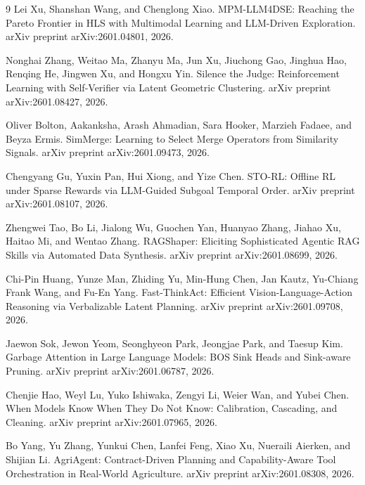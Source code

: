 \documentclass{article}
\begin{document}
\begin{thebibliography}{9}
Lei Xu, Shanshan Wang, and Chenglong Xiao. MPM-LLM4DSE: Reaching the Pareto Frontier in HLS with Multimodal Learning and LLM-Driven Exploration. arXiv preprint arXiv:2601.04801, 2026.

Nonghai Zhang, Weitao Ma, Zhanyu Ma, Jun Xu, Jiuchong Gao, Jinghua Hao, Renqing He, Jingwen Xu, and Hongxu Yin. Silence the Judge: Reinforcement Learning with Self-Verifier via Latent Geometric Clustering. arXiv preprint arXiv:2601.08427, 2026.

Oliver Bolton, Aakanksha, Arash Ahmadian, Sara Hooker, Marzieh Fadaee, and Beyza Ermis. SimMerge: Learning to Select Merge Operators from Similarity Signals. arXiv preprint arXiv:2601.09473, 2026.

Chengyang Gu, Yuxin Pan, Hui Xiong, and Yize Chen. STO-RL: Offline RL under Sparse Rewards via LLM-Guided Subgoal Temporal Order. arXiv preprint arXiv:2601.08107, 2026.

Zhengwei Tao, Bo Li, Jialong Wu, Guochen Yan, Huanyao Zhang, Jiahao Xu, Haitao Mi, and Wentao Zhang. RAGShaper: Eliciting Sophisticated Agentic RAG Skills via Automated Data Synthesis. arXiv preprint arXiv:2601.08699, 2026.

Chi-Pin Huang, Yunze Man, Zhiding Yu, Min-Hung Chen, Jan Kautz, Yu-Chiang Frank Wang, and Fu-En Yang. Fast-ThinkAct: Efficient Vision-Language-Action Reasoning via Verbalizable Latent Planning. arXiv preprint arXiv:2601.09708, 2026.

Jaewon Sok, Jewon Yeom, Seonghyeon Park, Jeongjae Park, and Taesup Kim. Garbage Attention in Large Language Models: BOS Sink Heads and Sink-aware Pruning. arXiv preprint arXiv:2601.06787, 2026.

Chenjie Hao, Weyl Lu, Yuko Ishiwaka, Zengyi Li, Weier Wan, and Yubei Chen. When Models Know When They Do Not Know: Calibration, Cascading, and Cleaning. arXiv preprint arXiv:2601.07965, 2026.

Bo Yang, Yu Zhang, Yunkui Chen, Lanfei Feng, Xiao Xu, Nueraili Aierken, and Shijian Li. AgriAgent: Contract-Driven Planning and Capability-Aware Tool Orchestration in Real-World Agriculture. arXiv preprint arXiv:2601.08308, 2026.

\end{thebibliography}
\end{document}
